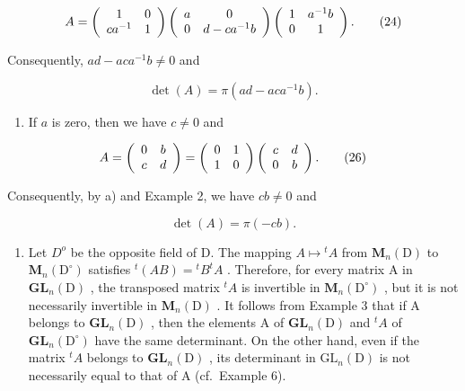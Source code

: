 \[
A = \left( \begin{array}{c c} 1 & 0 \\ c a ^ {- 1} & 1 \end{array} \right) \left( \begin{array}{c c} a & 0 \\ 0 & d - c a ^ {- 1} b \end{array} \right) \left( \begin{array}{c c} 1 & a ^ {- 1} b \\ 0 & 1 \end{array} \right).\tag{24}
\]

Consequently, \(ad - aca^{-1}b \neq 0\) and

\[
\det (A) = \pi (a d - a c a ^ {- 1} b).\tag{25}
\]

\begin{enumerate}
\def\labelenumi{\alph{enumi})}
\setcounter{enumi}{1}
\tightlist
\item
  If \(a\) is zero, then we have \(c \neq 0\) and
\end{enumerate}

\[
A = \left( \begin{array}{c c} 0 & b \\ c & d \end{array} \right) = \left( \begin{array}{c c} 0 & 1 \\ 1 & 0 \end{array} \right) \left( \begin{array}{c c} c & d \\ 0 & b \end{array} \right).\tag{26}
\]

Consequently, by a) and Example 2, we have \(cb \neq 0\) and

\[
\det (A) = \pi (- c b).\tag{27}
\]

\begin{enumerate}
\def\labelenumi{\arabic{enumi})}
\setcounter{enumi}{6}
\tightlist
\item
  Let \(D^{o}\) be the opposite field of D. The mapping \(A \mapsto {}^{t}A\) from \(\mathbf{M}_{n}(\mathrm{D})\) to \(\mathbf{M}_{n}(\mathrm{D}^{\circ})\) satisfies \({}^{t}(AB) = {}^{t}B^{t}A\) . Therefore, for every matrix A in \(\mathbf{GL}_{n}(\mathrm{D})\) , the transposed matrix \({}^{t}A\) is invertible in \(\mathbf{M}_{n}(\mathrm{D}^{\circ})\) , but it is not necessarily invertible in \(\mathbf{M}_{n}(\mathrm{D})\) . It follows from Example 3 that if A belongs to \(\mathbf{GL}_{n}(\mathrm{D})\) , then the elements A of \(\mathbf{GL}_{n}(\mathrm{D})\) and \({}^{t}A\) of \(\mathbf{GL}_{n}(\mathrm{D}^{\circ})\) have the same determinant. On the other hand, even if the matrix \({}^{t}A\) belongs to \(\mathbf{GL}_{n}(\mathrm{D})\) , its determinant in \(\mathrm{GL}_{n}(\mathrm{D})\) is not necessarily equal to that of A (cf.~Example 6).
\end{enumerate}

